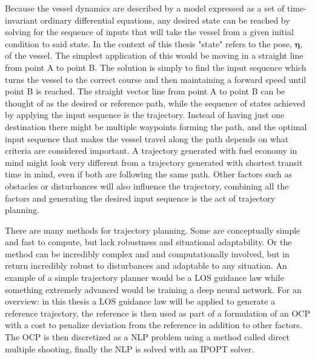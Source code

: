 Because the vessel dynamics are described by a model expressed as a set of time-invariant ordinary differential equations, any desired state
can be reached by solving for the sequence of inputs that will take the vessel from a given initial condition to said state. In the context of this
thesis "state" refers to the pose, $\bm{\eta}$, of the vessel. The simplest application of this would be moving in a straight line from point A to point B.
The solution is simply to find the input sequence which turns the vessel to the correct course and then maintaining a forward speed until point B is reached.
The straight vector line from point A to point B can be thought of as the desired or reference path, while the sequence of states achieved by applying the 
input sequence is the trajectory. Instead of having just one destination there might be multiple waypoints forming the path, and the optimal
input sequence that makes the vessel travel along the path depends on what criteria are considered important. A trajectory generated with fuel
economy in mind might look very different from a trajectory generated with shortest transit time in mind, even if both are following the same path.
Other factors such as obstacles or disturbances will also influence the trajectory, combining all the factors and generating the desired
input sequence is the act of trajectory planning.

There are many methods for trajectory planning. Some are conceptually simple and fast to compute, but lack robustness and situational adaptability.
Or the method can be incredibly complex and and computationally involved, but in return incredibly robust to disturbances and adaptable to
any situation. An example of a simple trajectory planner would be a \gls{LOS} guidance law while something extremely advanced would be training a deep
neural network. For an overview: in this thesis a \gls{LOS} guidance law will be applied to generate a reference trajectory, the reference is then used as part of a
formulation of an \gls{OCP} with a cost to penalize deviation from the reference in addition to other factors. The \gls{OCP} is then discretized
as a \gls{NLP} problem using a method called direct multiple shooting, finally the \gls{NLP} is solved with an \gls{IPOPT} solver.


